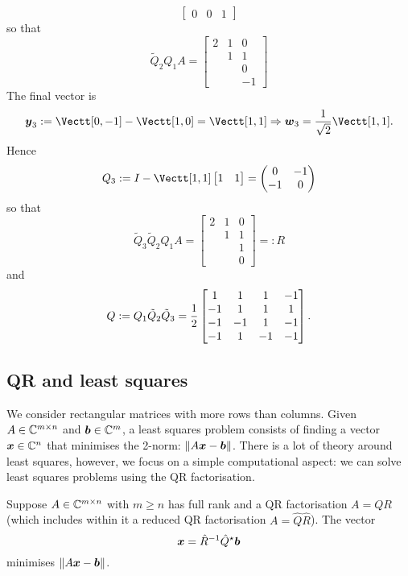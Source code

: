 \begin{example}[QR by hand]
\[\begin{bmatrix}
0 & 0 & 1
\end{bmatrix}
\]
so that
\[
\tilde Q_2 Q_1 A = \begin{bmatrix} 2 & 1 & 0 \\
 & 1 & 1 \\
  &  & 0 \\
&  & -1
\end{bmatrix}
\]
The final vector is 
\[
\ensuremath{\bm{\y}}_3 := \Vectt[0,-1] - \Vectt[1,0] = \Vectt[1,1] \ensuremath{\Rightarrow} \ensuremath{\bm{\w}}_3 = {1 \over \sqrt{2}} \Vectt[1,1].
\]
Hence
\[
Q_3 := I - \Vectt[1,1] \begin{bmatrix} 1 & 1 \end{bmatrix} = \sopmatrix{0 & - 1 \\ -1 & 0}
\]
so that 
\[
\tilde Q_3 \tilde Q_2 Q_1 A = \begin{bmatrix} 2 & 1 & 0 \\
 & 1 & 1 \\
  &  & 1 \\
&  & 0
\end{bmatrix} =: R
\]
and
\[
Q := Q_1 \tilde Q_2 \tilde Q_3 = {1 \over 2}  \begin{bmatrix}
1 & 1 & 1 & -1 \\
-1 & 1 & 1 & 1 \\
-1 & -1 & 1 & -1 \\
-1 & 1 & -1 & -1
\end{bmatrix}.
\]
\subsection{QR and least squares}
We consider rectangular matrices with more rows than columns. Given $A \in {\mathbb C}^{m \times n}$ and $\bm{{\mbox{\boldmath$b$\unboldmath}}} \in {\mathbb C}^m$, a least squares problem consists of finding a vector $\bm{{\mbox{\boldmath$x$\unboldmath}}} \in {\mathbb C}^n$ that minimises the 2-norm: $\| A \bm{{\mbox{\boldmath$x$\unboldmath}}} - \bm{{\mbox{\boldmath$b$\unboldmath}}} \|$. There is a lot of theory around least squares, however, we focus on a simple computational aspect: we can solve least squares problems using the QR factorisation.

\begin{theorem} Suppose $A \in {\mathbb C}^{m \times n}$ with $m \ensuremath{\geq} n$ has full rank and a QR factorisation $A = Q R$ (which includes within it a reduced QR factorisation $A = \hat Q \hat R$). The vector
\[
\bm{{\mbox{\boldmath$x$\unboldmath}}} = \hat R^{-1} \hat Q^\star \bm{{\mbox{\boldmath$b$\unboldmath}}}
\]
minimises $\| A \bm{{\mbox{\boldmath$x$\unboldmath}}} - \bm{{\mbox{\boldmath$b$\unboldmath}}} \|$. 


\end{theorem}
\end{example}
